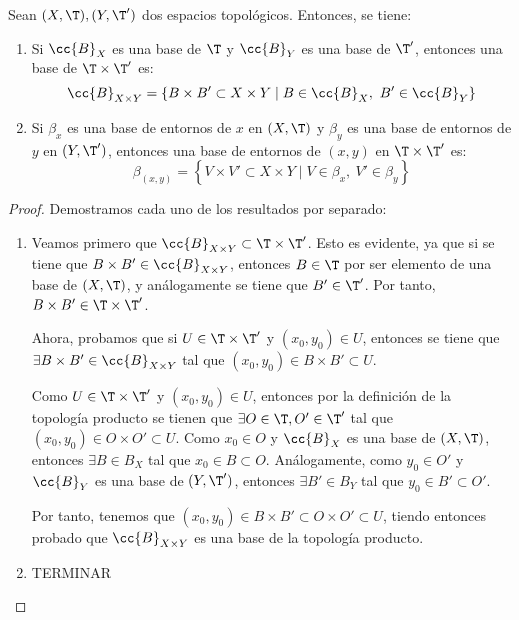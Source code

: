 \begin{prop}
    Sean $(X,\T), (Y,\T')$ dos espacios topológicos. Entonces, se tiene:
    \begin{enumerate}
        \item Si $\cc{B}_X$ es una base de $\T$ y $\cc{B}_Y$ es una base de $\T'$, entonces una base de $\T\times \T'$ es:
        \begin{equation*}
            \cc{B}_{X\times Y}=\left\{B\times B'\subset X\times Y\mid B\in \cc{B}_X,~B'\in \cc{B}_Y\right\}
        \end{equation*}

        \item Si $\beta_x$ es una base de entornos de $x$ en $(X,\T)$ y $\beta_y$ es una base de entornos de $y$ en $(Y,\T')$, entonces una base de entornos de $(x,y)$ en $\T\times \T'$ es:
        \begin{equation*}
            \beta_{(x,y)}=\left\{V\times V'\subset X\times Y\mid V\in \beta_x,~V'\in \beta_y\right\}
        \end{equation*}
    \end{enumerate}
\end{prop}
\begin{proof}
    Demostramos cada uno de los resultados por separado:
    \begin{enumerate}
        \item Veamos primero que $\cc{B}_{X\times Y}\subset \T\times \T'$. Esto es evidente, ya que si se tiene que $B\times B'\in\cc{B}_{X\times Y}$, entonces $B\in \T$ por ser elemento de una base de $(X,\T)$, y análogamente se tiene que $B'\in \T'$. Por tanto, $B\times B'\in \T\times \T'$.

        Ahora, probamos que si $U\in \T\times \T'$ y $(x_0,y_0)\in U$, entonces se tiene que $\exists B\times B'\in \cc{B}_{X\times Y}$ tal que $(x_0,y_0)\in B\times B'\subset U$.

        Como $U\in \T\times \T'$ y $(x_0,y_0)\in U$, entonces por la definición de la topología producto se tienen que $\exists O\in \T,O'\in \T'$ tal que $(x_0,y_0)\in O\times O'\subset U$. Como $x_0\in O$ y $\cc{B}_X$ es una base de $(X,\T)$, entonces $\exists B\in B_X$ tal que $x_0\in B\subset O$. Análogamente, como $y_0\in O'$ y $\cc{B}_Y$ es una base de $(Y,\T')$, entonces $\exists B'\in B_Y$ tal que $y_0\in B'\subset O'$.
        
        Por tanto, tenemos que $(x_0,y_0)\in B\times B'\subset O\times O'\subset U$, tiendo entonces probado que $\cc{B}_{X\times Y}$ es una base de la topología producto.

        \item TERMINAR
    \end{enumerate}
\end{proof}



